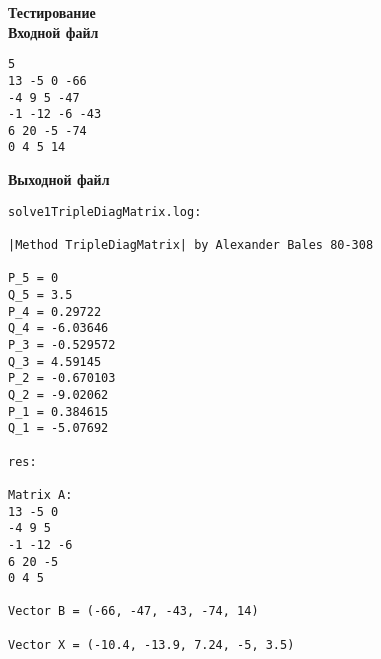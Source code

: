 \textbf{Тестирование}\\

\textbf{Входной файл}
\begin{verbatim}
5
13 -5 0 -66
-4 9 5 -47
-1 -12 -6 -43
6 20 -5 -74
0 4 5 14
\end{verbatim}

\textbf{Выходной файл}
\begin{verbatim}
solve1TripleDiagMatrix.log:

|Method TripleDiagMatrix| by Alexander Bales 80-308

P_5 = 0
Q_5 = 3.5
P_4 = 0.29722
Q_4 = -6.03646
P_3 = -0.529572
Q_3 = 4.59145
P_2 = -0.670103
Q_2 = -9.02062
P_1 = 0.384615
Q_1 = -5.07692

res:

Matrix A:
13 -5 0 
-4 9 5 
-1 -12 -6 
6 20 -5 
0 4 5 

Vector B = (-66, -47, -43, -74, 14)

Vector X = (-10.4, -13.9, 7.24, -5, 3.5)
\end{verbatim}

\pagebreak

